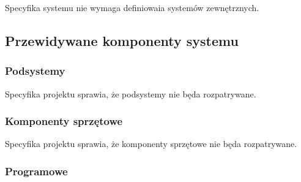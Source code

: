 Specyfika systemu nie wymaga definiowaia systemów zewnętrznych.




\subsection{Przewidywane komponenty systemu}


\subsubsection{Podsystemy}
Specyfika projektu sprawia, że podsystemy nie będa rozpatrywane.

\subsubsection{Komponenty sprzętowe}
Specyfika projektu sprawia, że komponenty sprzętowe nie będa rozpatrywane.

\subsubsection{Programowe}


